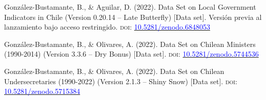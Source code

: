 





\begin{publications}

\begin{benumerate}{3}

\item{\small González-Bustamante, B., \& Aguilar, D. (2022). Data Set on Local Government Indicators in Chile (Version 0.20.14 -- Late Butterfly) [Data set]. Versión previa al lanzamiento bajo acceso restringido. {\scshape doi:} \href{https://doi.org/10.5281/zenodo.6848053}{\textcolor{blue}{10.5281/zenodo.6848053}}}\vspace{1mm}

\item{\small González-Bustamante, B., \& Olivares, A. (2022). Data Set on Chilean Ministers (1990-2014) (Version 3.3.6 -- Dry Bonus) [Data set]. {\scshape doi:} \href{https://doi.org/10.5281/zenodo.5744536}{\textcolor{blue}{10.5281/zenodo.5744536}}}\vspace{1mm}

\item{González-Bustamante, B., \& Olivares, A. (2022). Data Set on Chilean Undersecretaries (1990-2022) (Version 2.1.3 -- Shiny Snow) [Data set]. {\scshape doi:} \href{https://doi.org/10.5281/zenodo.5715384}{\textcolor{blue}{10.5281/zenodo.5715384}}}\vspace{1mm}

\end{benumerate}

\end{publications}
\pagebreak


